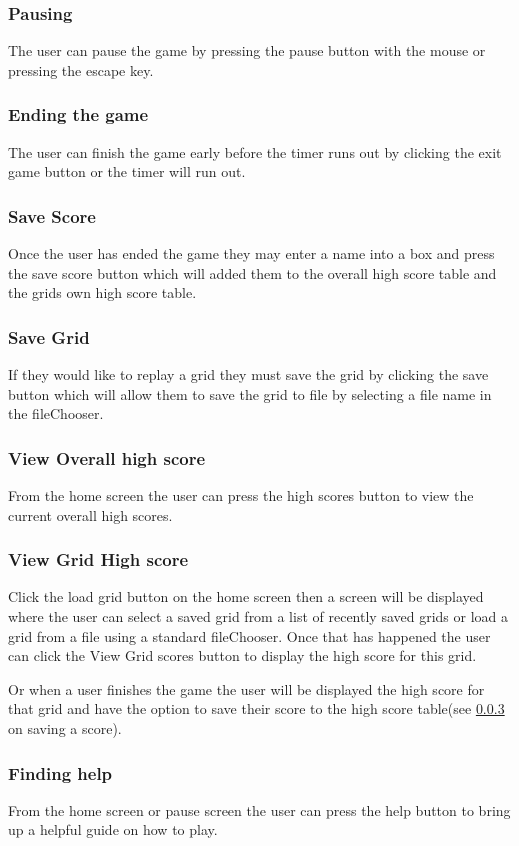 \documentclass{project}
\begin{document}
			
		\subsubsection{Pausing} \label{Pausing}
		The user can pause the game by pressing the pause button with the mouse or pressing the escape key.
		\subsubsection{Ending the game} \label{Ending the game}
		The user can finish the game early before the timer runs out by clicking the exit game button or the timer will run out.
		\subsubsection{Save Score} \label{Save score}
			Once the user has ended the game they may enter a name into a box and press the save score button which will added them to the overall high score table and the grids own high score table.
		\subsubsection{Save Grid}	\label{Save grid}
			If they would like to replay a grid they must save the grid by clicking the save button which will allow them to save the grid to file by selecting a file name in the fileChooser.
		\subsubsection{View Overall high score} \label{View Overall highscore}
		From the home screen the user can press the high scores button to view the current overall high scores.
		\subsubsection{View Grid High score} \label{View Grid HigScore}
		Click the load grid button on the home screen then a screen will be displayed where the user can select a saved grid from a list of recently saved grids or load a grid from a file using a standard fileChooser. Once that has happened the user can click the View Grid scores button to display the high score for this grid.
		
		Or when a user finishes the game the user will be displayed the high score for that grid and have the option to save their score to the high score table(see \ref{Save score}  on saving a score).
		\subsubsection{Finding help} \label{Finding help}
		From the home screen or pause screen the user can press the help button to bring up a helpful guide on how to play.
		
\end{document}
